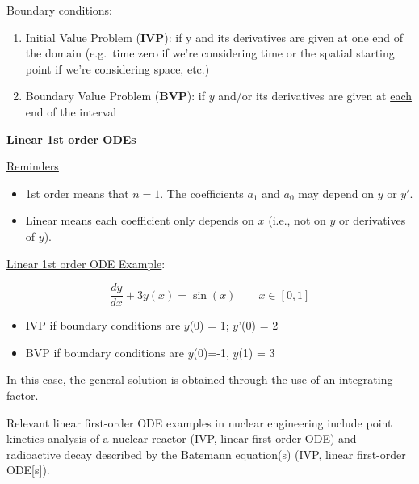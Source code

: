 \documentclass[12pt]{article}
\begin{document}
Boundary conditions:

\begin{enumerate}
\item Initial Value Problem (\textbf{IVP}): if y and its derivatives are given 
      at one end of the domain (e.g.\ time zero if we're considering time or the spatial starting point if we're considering space, etc.)
\item Boundary Value Problem (\textbf{BVP}): if $y$ and/or its derivatives are
      given at \underline{each} end of the interval
\end{enumerate}

\vspace*{1em}
\textbf{Linear 1st order ODEs}

\underline{Reminders}

\begin{itemize}
\item 1st order means that $n=1$. The  coefficients $a_1$ and $a_0$ may depend 
      on $y$ or $y'$.
\item Linear means each coefficient only depends on $x$ (i.e., not on $y$ or
      derivatives of $y$).
\end{itemize}

\underline{Linear 1st order ODE Example}:

\begin{equation}
\frac{dy}{dx} + 3y(x) = \sin(x) \qquad x \in [0, 1] \nonumber
\end{equation}

\begin{itemize}
\item IVP if boundary conditions are $y$(0) = 1; $y$'(0) = 2
\item BVP if boundary conditions are $y$(0)=-1, $y$(1) = 3 
\end{itemize}

In this case, the general solution is obtained through the use of an 
integrating factor.

Relevant linear first-order ODE examples in nuclear engineering include point
kinetics analysis of a nuclear reactor (IVP, linear first-order ODE) and
radioactive decay described by the Batemann equation(s) (IVP, linear
first-order ODE[s]).
\end{document}
